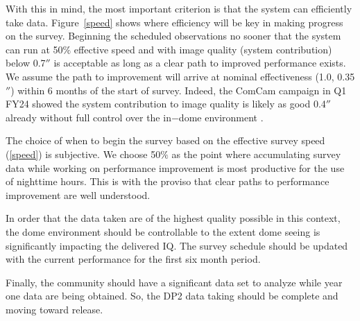 With this in mind, the most important criterion is that the system can efficiently take data. Figure~\ref{speed} shows where efficiency will be key in making progress on the survey. Beginning the scheduled observations no sooner that the system can run at 50$\%$ effective speed and with image quality (system contribution) below 0.7$''$ is acceptable as long as a clear path to improved performance exists. We assume the path to improvement will arrive at nominal effectiveness (1.0, 0.35$''$) within 6 months of the start of survey. Indeed, the ComCam campaign in Q1 FY24 showed the system contribution to image quality is likely as good 0.4$''$ already without full control over the in$-$dome environment \citep[See][ section 2.2]{SITCOMTN-149}.

The choice of when to begin the survey based on the effective survey speed (\ref{speed}) is subjective. We choose 50$\%$ as the point where accumulating survey data while working on performance improvement is most productive for the use of nighttime hours. This is with the proviso that clear paths to performance improvement are well understood.

In order that the data taken are of the highest quality possible in this context, the dome environment should be controllable to the extent dome seeing is significantly impacting the delivered IQ. The survey schedule should be updated with the current performance for the first six month period.

Finally, the community should have a significant data set to analyze while year one data are being obtained. So, the DP2 data taking should be complete and moving toward release. 

